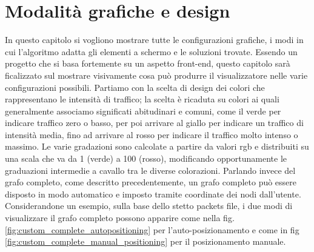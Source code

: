 \documentclass[binding=0.6cm]{sapthesis}
\begin{document}
\section{Modalità grafiche e design}
In questo capitolo si vogliono mostrare tutte le configurazioni grafiche, i modi in cui l'algoritmo adatta gli elementi a schermo e le soluzioni trovate.
Essendo un progetto che si basa fortemente su un aspetto front-end, questo capitolo sarà ficalizzato sul mostrare visivamente cosa può produrre il visualizzatore nelle varie configurazioni possibili.
Partiamo con la scelta di design dei colori che rappresentano le intensità di traffico; la scelta è ricaduta su colori ai quali generalmente associamo significati abitudinari e comuni,
come il verde per indicare traffico zero o basso, per poi arrivare al giallo per indicare un traffico di intensità media, fino ad arrivare al rosso
per indicare il traffico molto intenso o massimo. Le varie gradazioni sono calcolate a partire da valori rgb e distribuiti su una scala che va da 1 (verde) a 100 (rosso), modificando opportunamente le graduazioni intermedie a cavallo tra le diverse colorazioni.
Parlando invece del grafo completo, come descritto precedentemente, un grafo completo può essere disposto in modo automatico e imposto tramite coordinate dei nodi dall'utente. 
Considerandone un esempio, sulla base dello stetto packets file, i due modi di visualizzare il grafo completo possono apparire come nella fig. \ref{fig:custom_complete_autopositioning} per l'auto-posizionamento e come in fig \ref{fig:custom_complete_manual_positioning} per il posizionamento manuale.
\end{document}
